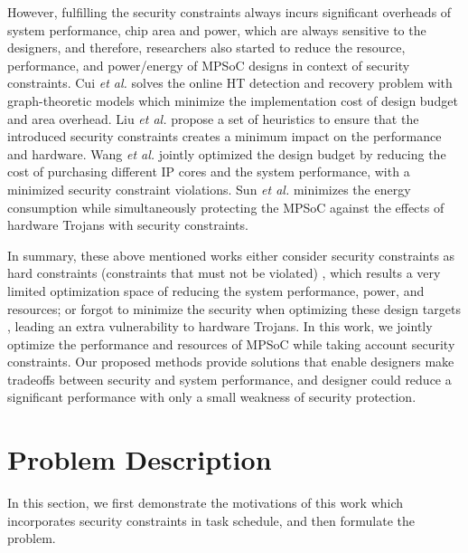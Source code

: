 \documentclass[10pt,journal]{IEEEtran}
\begin{document}
However, fulfilling the security constraints always incurs significant overheads of system performance, chip area and power, which are always sensitive to the designers, and therefore, researchers also started to reduce the resource, performance, and power/energy of MPSoC designs in context of security constraints. Cui \textit{et al.} \cite{article:XC} solves the online HT detection and recovery problem with graph-theoretic models which minimize the implementation cost of design budget and area overhead. Liu \textit{et al.} \cite{article:CL} propose a set of heuristics to ensure that the introduced security constraints creates a minimum impact on the performance and hardware. Wang \textit{et al.} \cite{article:NW} jointly optimized the design budget by reducing the cost of purchasing different IP cores and the system performance, with a minimized security constraint violations. Sun \textit{et al.} \cite{article:YS} minimizes the energy consumption while simultaneously protecting the MPSoC against the effects of hardware Trojans with security constraints.

In summary, these above mentioned works either consider security constraints as hard constraints (constraints that must not be violated) \cite{article:XC} \cite{conference:AS} \cite{article:YS}, which results a very limited optimization space of reducing the system performance, power, and resources; or forgot to minimize the security when optimizing these design targets \cite{article:CL} \cite{article:NW}, leading an extra vulnerability to hardware Trojans. In this work, we jointly optimize the performance and resources of MPSoC while taking account security constraints. Our proposed methods provide solutions that enable designers make tradeoffs between security and system performance, and designer could reduce a significant performance with only a small weakness of security protection.

\section{Problem Description}

In this section, we first demonstrate the motivations of this work which incorporates security constraints in task schedule, and then formulate the problem.

\end{document}
